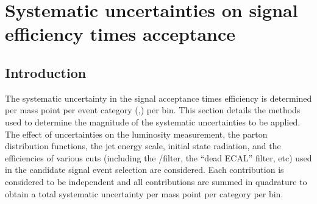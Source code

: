 %

\clearpage
\section{Systematic uncertainties on signal efficiency times
  acceptance\label{sec:sms-syst}}

\subsection{Introduction} 

The systematic uncertainty in the signal acceptance times efficiency
is determined per mass point per event category (\njet,\nb) per
\scalht bin. This section details the methods used to determine the
magnitude of the systematic uncertainties to be applied. The effect of
uncertainties on the luminosity measurement, the parton distribution
functions, the jet energy scale, initial state radiation, and the
efficiencies of various cuts (including the \mht/\met filter, the
``dead ECAL'' filter, etc)
used in the candidate signal event selection are considered. Each
contribution is considered to be independent and all contributions are
summed in quadrature to obtain a total systematic uncertainty per mass
point per category per \scalht bin. 

